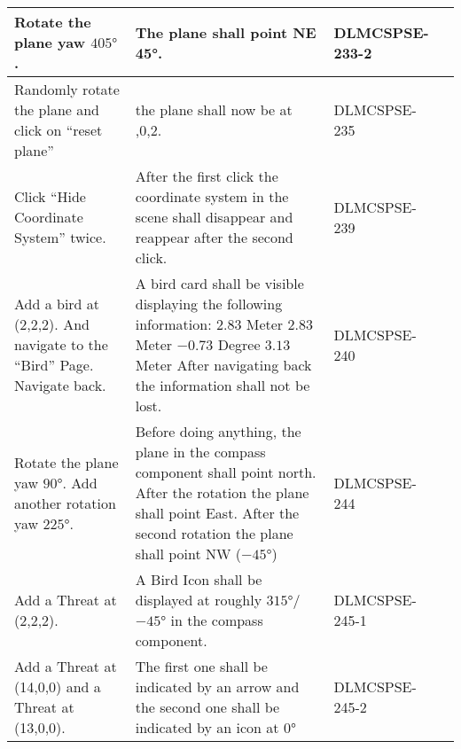 \begin{xltabular}{\textwidth}{|X|X|M{2cm}|M{2cm}|}
  Rotate the plane yaw $405°$. & The plane shall point NE 45°. & {\color{purpleT}\ttfamily DLMCSPSE-233-2} &  \\ \hline 
  Randomly rotate the plane and click on \enquote{reset plane} & the plane shall now be at {,0,2}. & {\color{purpleT}\ttfamily DLMCSPSE-235} &  \\ \hline 
  Click \enquote{Hide Coordinate System} twice. & After the first click the coordinate system in the scene shall disappear and reappear after the second click. & {\color{purpleT}\ttfamily DLMCSPSE-239} &  \\ \hline 
  Add a bird at {\ttfamily (2,2,2)}. And navigate to the \enquote{Bird} Page. \newline Navigate back. & A bird card shall be visible displaying the following information: \newline $2.83$ Meter \newline $2.83$ Meter \newline $-0.73$ Degree \newline $3.13$ Meter \newline After navigating back the information shall not be lost. & {\color{purpleT}\ttfamily DLMCSPSE-240} &  \\ \hline 
  Rotate the plane yaw $90°$. \newline Add another rotation yaw $225°$. & Before doing anything, the plane in the compass component shall point north. \newline After the rotation the plane shall point East. After the second rotation the plane shall point NW ($-45°$) & {\color{purpleT}\ttfamily DLMCSPSE-244} &  \\ \hline 
  Add a Threat at (2,2,2). & A Bird Icon shall be displayed at roughly $315°$/$-45°$ in the compass component. & {\color{purpleT}\ttfamily DLMCSPSE-245-1} &  \\ \hline 
  Add a Threat at {\ttfamily (14,0,0)} and a Threat at {\ttfamily (13,0,0)}. & The first one shall be indicated by an arrow and the second one shall be indicated by an icon at $0°$ & {\color{purpleT}\ttfamily DLMCSPSE-245-2} &  \\ \hline 
  
\end{xltabular} 
 \egroup 
 \color{default}